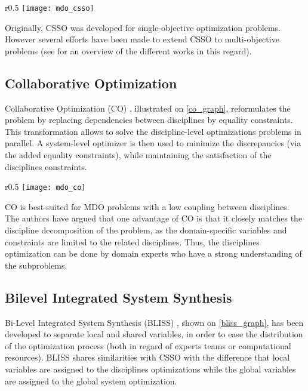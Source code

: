 \begin{wrapfigure}{r}{0.5\textwidth}
\centering
\texttt{[image: mdo\_csso]}
\caption{CSSO method.}\label{csso_graph}
\end{wrapfigure}

Originally, CSSO was developed for single-objective optimization problems. However several efforts have been made to extend CSSO to multi-objective problems (see \cite{zhang2011} for an overview of the different works in this regard).

\subsection{Collaborative Optimization}

Collaborative Optimization (CO) \cite{Ilan:1994:MOM:887207}, illustrated on \figurename{} \ref{co_graph}, reformulates the problem by replacing dependencies between disciplines by equality constraints. This transformation allows to solve the discipline-level optimizations problems in parallel. A system-level optimizer is then used to minimize the discrepancies (via the added equality constraints), while maintaining the satisfaction of the disciplines constraints.

\begin{wrapfigure}{r}{0.5\textwidth}
\centering
\texttt{[image: mdo\_co]}
\caption{CO method.}\label{co_graph}
\end{wrapfigure}

CO is best-suited for MDO problems with a low coupling between disciplines. The authors have argued that one advantage of CO is that it closely matches the discipline decomposition of the problem, as the domain-specific variables and constraints are limited to the related disciplines. Thus, the disciplines optimization can be done by domain experts who have a strong understanding of the subproblems.

\subsection{Bilevel Integrated System Synthesis}

Bi-Level Integrated System Synthesis (BLISS) \cite{J.:1998:BIS:886310}, shown on \figurename{} \ref{bliss_graph}, has been developed to separate local and shared variables, in order to ease the distribution of the optimization process (both in regard of experts teams or computational resources).
BLISS shares similarities with CSSO with the difference that local variables are assigned to the disciplines optimizations while the global variables are assigned to the global system optimization.

